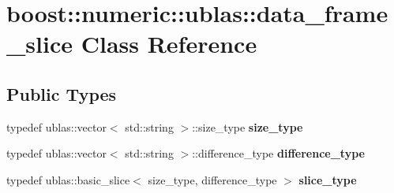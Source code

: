\hypertarget{classboost_1_1numeric_1_1ublas_1_1data__frame__slice}{}\section{boost\+:\+:numeric\+:\+:ublas\+:\+:data\+\_\+frame\+\_\+slice Class Reference}
\label{classboost_1_1numeric_1_1ublas_1_1data__frame__slice}
\subsection*{Public Types}
\begin{DoxyCompactItemize}
\item 
typedef ublas\+::vector$<$ std\+::string $>$\+::size\+\_\+type {\bfseries size\+\_\+type}\hypertarget{classboost_1_1numeric_1_1ublas_1_1data__frame__slice_a2114fd2d03f240c9615dacced3923e7b}{}\label{classboost_1_1numeric_1_1ublas_1_1data__frame__slice_a2114fd2d03f240c9615dacced3923e7b}

\item 
typedef ublas\+::vector$<$ std\+::string $>$\+::difference\+\_\+type {\bfseries difference\+\_\+type}\hypertarget{classboost_1_1numeric_1_1ublas_1_1data__frame__slice_ac210ab953edb010821fe04d193ab4af5}{}\label{classboost_1_1numeric_1_1ublas_1_1data__frame__slice_ac210ab953edb010821fe04d193ab4af5}

\item 
typedef ublas\+::basic\+\_\+slice$<$ size\+\_\+type, difference\+\_\+type $>$ {\bfseries slice\+\_\+type}\hypertarget{classboost_1_1numeric_1_1ublas_1_1data__frame__slice_a9855c89bf0b3ea9b1cc58f2831ee85fd}{}\label{classboost_1_1numeric_1_1ublas_1_1data__frame__slice_a9855c89bf0b3ea9b1cc58f2831ee85fd}

\end{DoxyCompactItemize}
